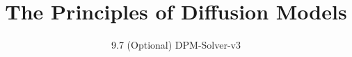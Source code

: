 ﻿%

\title{The Principles of Diffusion Models}
\subtitle{9.7 (Optional) DPM-Solver-v3}


\begin{frame}
    \titlepage
\end{frame}


